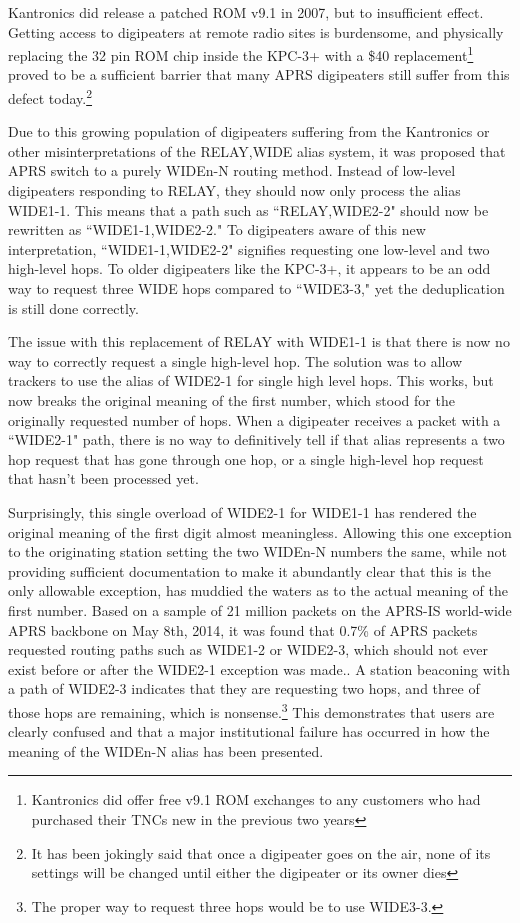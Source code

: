 Kantronics did release a patched ROM v9.1 in 2007, but to insufficient effect.
Getting access to digipeaters at remote radio sites is burdensome,
and physically replacing the 32 pin ROM chip inside the KPC-3+ 
with a \$40 replacement\footnote{Kantronics did offer free v9.1 ROM exchanges to 
any customers who had purchased their TNCs new in the previous two years} 
proved to be a sufficient barrier that many APRS digipeaters still
suffer from this defect today.\footnote{It has been jokingly said 
	that once a digipeater goes on the air,
	none of its settings will be changed until either the digipeater
or its owner dies}

Due to this growing population of digipeaters suffering from the Kantronics or other
misinterpretations of the RELAY,WIDE alias system, 
it was proposed that APRS switch to a purely WIDEn-N routing method. 
Instead of low-level digipeaters responding to RELAY,
they should now only process the alias WIDE1-1.
This means that a path such as ``RELAY,WIDE2-2" should now be rewritten as
``WIDE1-1,WIDE2-2." 
To digipeaters aware of this new interpretation, ``WIDE1-1,WIDE2-2" signifies 
requesting one low-level and two high-level hops.
To older digipeaters like the KPC-3+, it appears to be an odd way to request
three WIDE hops compared to ``WIDE3-3," 
yet the deduplication is still done correctly.

The issue with this replacement of RELAY with WIDE1-1 is that there is now
no way to correctly request a single high-level hop.
The solution was to allow trackers to use the alias of WIDE2-1 for single
high level hops.
This works, but now breaks the original meaning of the first number,
which stood for the originally requested number of hops.
When a digipeater receives a packet with a ``WIDE2-1" path, 
there is no way to definitively
tell if that alias represents a two hop request that has gone through one hop,
or a single high-level hop request that hasn't been processed yet.

Surprisingly, this single overload of WIDE2-1 for WIDE1-1 has rendered the
original meaning of the first digit almost meaningless.
Allowing this one exception to the originating station setting the two WIDEn-N
numbers the same, while not providing sufficient documentation
to make it abundantly clear that this is the only allowable exception,
has muddied the waters as to the actual meaning of the first number.
Based on a sample of 21 million packets on the APRS-IS world-wide APRS 
backbone on May 8th, 2014, it was found that
0.7\% of APRS packets requested routing paths such as WIDE1-2 or WIDE2-3,
which should not ever exist before or after the WIDE2-1 exception was made..
A station beaconing with a path of WIDE2-3 indicates that they are requesting
two hops, and three of those hops are remaining, which is nonsense.\footnote{The
proper way to request three hops would be to use WIDE3-3.}
This demonstrates that users are clearly confused and that a
major institutional failure has occurred in how the meaning of the WIDEn-N alias has
been presented.

